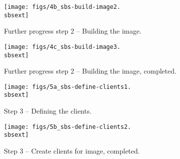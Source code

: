 \begin{figure}[htbp]
  \begin{center}
    \texttt{[image: figs/4b\_sbs-build-image2.\\sbsext]}
    \caption{Further progress step 2 -- Building the image.}
    \label{fig:sbs-build-image-progress}
  \end{center}
\end{figure}

\begin{figure}[htbp]
  \begin{center}
    \texttt{[image: figs/4c\_sbs-build-image3.\\sbsext]}
    \caption{Further progress step 2 -- Building the image, completed.}
    \label{fig:sbs-build-image2}
  \end{center}
\end{figure}


\begin{figure}[htbp]
  \begin{center}
    \texttt{[image: figs/5a\_sbs-define-clients1.\\sbsext]}
    \caption{Step 3 -- Defining the clients.}
    \label{fig:sbs-define-clients}
  \end{center}
\end{figure}

\begin{figure}[htbp]
  \begin{center}
    \texttt{[image: figs/5b\_sbs-define-clients2.\\sbsext]}
    \caption{Step 3 -- Create clients for image, completed.}
    \label{fig:sbs-define-clients2}
  \end{center}
\end{figure}


